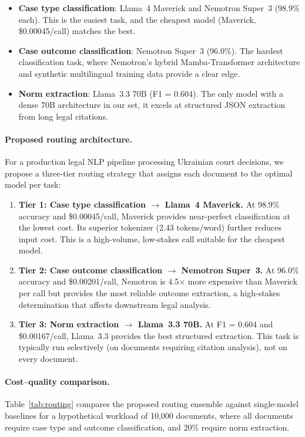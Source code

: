 \documentclass[11pt,a4paper]{article}
\begin{document}
\begin{itemize}[leftmargin=*]
    \item \textbf{Case type classification}: Llama~4 Maverick and Nemotron Super~3 (98.9\% each). This is the easiest task, and the cheapest model (Maverick, \$0.00045/call) matches the best.
    \item \textbf{Case outcome classification}: Nemotron Super~3 (96.0\%). The hardest classification task, where Nemotron's hybrid Mamba-Transformer architecture and synthetic multilingual training data provide a clear edge.
    \item \textbf{Norm extraction}: Llama~3.3 70B (F1 = 0.604). The only model with a dense 70B architecture in our set, it excels at structured JSON extraction from long legal citations.
\end{itemize}

\paragraph{Proposed routing architecture.}
For a production legal NLP pipeline processing Ukrainian court decisions, we propose a three-tier routing strategy that assigns each document to the optimal model per task:

\begin{enumerate}[leftmargin=*]
    \item \textbf{Tier 1: Case type classification $\rightarrow$ Llama~4 Maverick.} At 98.9\% accuracy and \$0.00045/call, Maverick provides near-perfect classification at the lowest cost. Its superior tokenizer (2.43 tokens/word) further reduces input cost. This is a high-volume, low-stakes call suitable for the cheapest model.
    \item \textbf{Tier 2: Case outcome classification $\rightarrow$ Nemotron Super~3.} At 96.0\% accuracy and \$0.00201/call, Nemotron is 4.5$\times$ more expensive than Maverick per call but provides the most reliable outcome extraction, a high-stakes determination that affects downstream legal analysis.
    \item \textbf{Tier 3: Norm extraction $\rightarrow$ Llama~3.3 70B.} At F1 = 0.604 and \$0.00167/call, Llama~3.3 provides the best structured extraction. This task is typically run selectively (on documents requiring citation analysis), not on every document.
\end{enumerate}

\paragraph{Cost--quality comparison.}
Table~\ref{tab:routing} compares the proposed routing ensemble against single-model baselines for a hypothetical workload of 10,000 documents, where all documents require case type and outcome classification, and 20\% require norm extraction.
\end{document}
